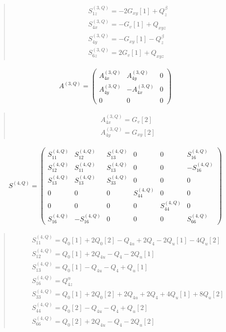 \documentclass[fleqn,10pt]{jsarticle}
\begin{document}
\begin{quote}
\begin{align*}
& S^{(3,Q)}_{1z} = - 2 G_{xy}[1] + Q_{z}^{\beta} \\
& S^{(3,Q)}_{4x} = - G_{v}[1] + Q_{xyz} \\
& S^{(3,Q)}_{4y} = - G_{xy}[1] - Q_{z}^{\beta} \\
& S^{(3,Q)}_{6z} = 2 G_{v}[1] + Q_{xyz}
\end{align*}
\end{quote}
\begin{align*}
A^{(3,Q)} = \begin{pmatrix} A^{(3,Q)}_{4x} & A^{(3,Q)}_{4y} & 0 \\ A^{(3,Q)}_{4y} & - A^{(3,Q)}_{4x} & 0 \\ 0 & 0 & 0 \end{pmatrix}
\end{align*}
\begin{quote}
\begin{align*}
& A^{(3,Q)}_{4x} = G_{v}[2] \\
& A^{(3,Q)}_{4y} = G_{xy}[2]
\end{align*}
\end{quote}
\begin{align*}
S^{(4,Q)} = \begin{pmatrix} S^{(4,Q)}_{11} & S^{(4,Q)}_{12} & S^{(4,Q)}_{13} & 0 & 0 & S^{(4,Q)}_{16} \\ S^{(4,Q)}_{12} & S^{(4,Q)}_{11} & S^{(4,Q)}_{13} & 0 & 0 & - S^{(4,Q)}_{16} \\ S^{(4,Q)}_{13} & S^{(4,Q)}_{13} & S^{(4,Q)}_{33} & 0 & 0 & 0 \\ 0 & 0 & 0 & S^{(4,Q)}_{44} & 0 & 0 \\ 0 & 0 & 0 & 0 & S^{(4,Q)}_{44} & 0 \\ S^{(4,Q)}_{16} & - S^{(4,Q)}_{16} & 0 & 0 & 0 & S^{(4,Q)}_{66} \end{pmatrix}
\end{align*}
\begin{quote}
\begin{align*}
& S^{(4,Q)}_{11} = Q_{0}[1] + 2 Q_{0}[2] - Q_{4u} + 2 Q_{4} - 2 Q_{u}[1] - 4 Q_{u}[2] \\
& S^{(4,Q)}_{12} = Q_{0}[1] + 2 Q_{4u} - Q_{4} - 2 Q_{u}[1] \\
& S^{(4,Q)}_{13} = Q_{0}[1] - Q_{4u} - Q_{4} + Q_{u}[1] \\
& S^{(4,Q)}_{16} = Q_{4z}^{\alpha} \\
& S^{(4,Q)}_{33} = Q_{0}[1] + 2 Q_{0}[2] + 2 Q_{4u} + 2 Q_{4} + 4 Q_{u}[1] + 8 Q_{u}[2] \\
& S^{(4,Q)}_{44} = Q_{0}[2] - Q_{4u} - Q_{4} + Q_{u}[2] \\
& S^{(4,Q)}_{66} = Q_{0}[2] + 2 Q_{4u} - Q_{4} - 2 Q_{u}[2]
\end{align*}
\end{quote}
\end{document}
